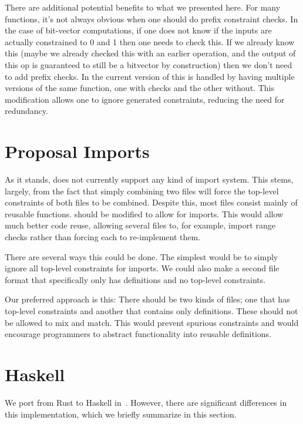 \documentclass[
    9pt,            
    techreport,       
    affiltop,       
]{art}
\begin{document}
There are additional potential benefits to what we presented here. For many functions, it's not always obvious when one should do prefix constraint checks. In the case of bit-vector computations, if one does not know if the inputs are actually constrained to 0 and 1 then one needs to check this. If we already know this (maybe we already checked this with an earlier operation, and the output of this op is guaranteed to still be a bitvector by construction) then we don't need to add prefix checks. In the current version of \VampIR{} this is handled by having multiple versions of the same function, one with checks and the other without. This modification allows one to ignore generated constraints, reducing the need for redundancy.

\section{Proposal \VampIR{} Imports}
\label{sec:imports}

As it stands, \VampIR{} does not currently support any kind of import system. This stems, largely, from the fact that simply combining two files will force the top-level constraints of both files to be combined. Despite this, most \VampIR{} files consist mainly of reusable functions. \VampIR{} should be modified to allow for imports. This would allow much better code reuse, allowing several files to, for example, import range checks rather than forcing each to re-implement them.

There are several ways this could be done. The simplest would be to simply ignore all top-level constraints for imports. We could also make a second file format that specifically only has definitions and no top-level constraints.

Our preferred approach is this: There should be two kinds of \VampIR{} files; one that has top-level constraints and another that contains only definitions. These should not be allowed to mix and match. This would prevent spurious constraints and would encourage programmers to abstract functionality into reusable definitions.

\section{\VampIR{} Haskell}\label{sec:vamp-ir-haskell}

We port \VampIR{} from Rust to Haskell in~\citep{vamp-ir-haskell}. However, there are significant differences in this \VampIR{} implementation, which we briefly summarize in this section.
\end{document}
